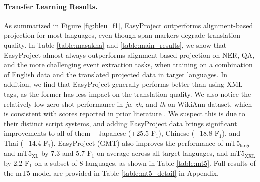 \documentclass[11pt,dvipsnames]{article}
\begin{document}
\paragraph{Transfer Learning Results.} As summarized in Figure \ref{fig:bleu_f1}, EasyProject outperforms  alignment-based projection for most languages, even though span markers degrade translation quality. In Table \ref{table:masakha} and \ref{table:main_results}, we show that EasyProject almost always outperforms alignment-based projection on NER, QA, and the more challenging event extraction tasks, when training on a combination of English data and the translated  projected data in target languages. In addition, we  find that EasyProject  generally performs better than using XML tags, as the former has less impact on the translation quality.
We also notice the relatively low zero-shot performance in  \textit{ja}, \textit{zh}, and \textit{th} on WikiAnn dataset, which is consistent with scores reported in prior literature \cite{he2021effectiveness}. We suspect this is due to their distinct script systems, and adding EasyProject data brings significant improvements to all of them – Japanese (+25.5 F$_1$), Chinese (+18.8 F$_1$), and Thai (+14.4 F$_1$). 
 EasyProject (GMT) also improves the performance of  mT5$_{\text{large}}$ and mT5$_{\text{XL}}$ by 7.3 and 5.7 F$_1$ on average across all target languages, and mT5$_{\text{XXL}}$ by 2.2 F$_1$ on a subset of 8 languages, as shown in  Table \ref{table:mt5}. Full results of the mT5 model are provided in  Table \ref{table:mt5_detail} in  Appendix.
\end{document}
